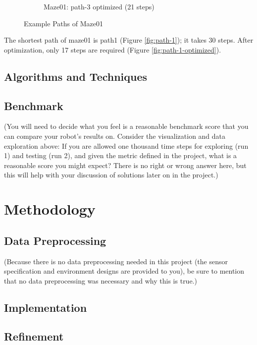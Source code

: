 \documentclass[11pt, oneside]{article}   	%
\begin{document}
\begin{figure}
\begin{subfigure}{7cm}
  \caption{Maze01: path-3 optimized (21 steps)}
  \label{fig:path-3-optimized}
\end{subfigure}
\caption{Example Paths of Maze01}
\label{fig:test}
\end{figure}

The shortest path of maze01 is path1 (Figure \ref{fig:path-1}); it takes 30 steps. After optimization, only 17 steps are required (Figure \ref{fig:path-1-optimized}).


\subsection{Algorithms and Techniques}

\subsection{Benchmark}
(You will need to decide what you feel is a reasonable benchmark score that you can compare your robot’s results on. Consider the visualization and data exploration above: If you are allowed one thousand time steps for exploring (run 1) and testing (run 2), and given the metric defined in the project, what is a reasonable score you might expect? There is no right or wrong answer here, but this will help with your discussion of solutions later on in the project.)


\section{Methodology}
\subsection{Data Preprocessing}
(Because there is no data preprocessing needed in this project (the sensor specification and environment designs are provided to you), be sure to mention that no data preprocessing was necessary and why this is true.)
\subsection{Implementation}
\subsection{Refinement}




\end{document}
